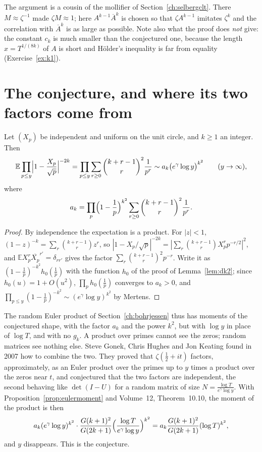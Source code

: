 The argument is a cousin of the mollifier of Section~\ref{ch:selbergclt}. There $M\approx\zeta^{-1}$ made $\zeta M\approx1$; here $A^{k-1}\overline A^k$ is chosen so that $\zeta A^{k-1}$ imitates $\zeta^k$ and the correlation with $\overline A^k$ is as large as possible. Note also what the proof does \emph{not} give: the constant $c_k$ is much smaller than the conjectured one, because the length $x=T^{1/(8k)}$ of $A$ is short and Hölder's inequality is far from equality (Exercise~\ref{ex:k1}).

\section{The conjecture, and where its two factors come from}

\begin{proposition}\label{prop:eulermoment}
Let $(X_p)$ be independent and uniform on the unit circle, and $k\ge1$ an integer. Then
\[
\mathbb E\prod_{p\le y}\Bigl|1-\frac{X_p}{\sqrt p}\Bigr|^{-2k}=\prod_{p\le y}\sum_{r\ge0}\binom{k+r-1}r^2\frac1{p^r}\sim a_k\bigl(e^\gamma\log y\bigr)^{k^2}\qquad(y\to\infty),
\]
where
\[
a_k=\prod_p\Bigl(1-\frac1p\Bigr)^{k^2}\sum_{r\ge0}\binom{k+r-1}r^2\frac1{p^r}.
\]
\end{proposition}
\begin{proof}
By independence the expectation is a product. For $|z|<1$, $(1-z)^{-k}=\sum_r\binom{k+r-1}rz^r$, so $|1-X_p/\sqrt p|^{-2k}=|\sum_r\binom{k+r-1}rX_p^rp^{-r/2}|^2$, and $\mathbb EX_p^r\overline{X_p}^{r'}=\delta_{rr'}$ gives the factor $\sum_r\binom{k+r-1}r^2p^{-r}$. Write it as $(1-\frac1p)^{-k^2}h_0(\frac1p)$ with the function $h_0$ of the proof of Lemma~\ref{lem:dk2}; since $h_0(u)=1+O(u^2)$, $\prod_ph_0(\frac1p)$ converges to $a_k>0$, and $\prod_{p\le y}(1-\frac1p)^{-k^2}\sim(e^\gamma\log y)^{k^2}$ by Mertens.
\end{proof}

The random Euler product of Section~\ref{ch:bohrjessen} thus has moments of the conjectured shape, with the factor $a_k$ and the power $k^2$, but with $\log y$ in place of $\log T$, and with no $g_k$. A product over primes cannot see the zeros; random matrices see nothing else. Steve Gonek, Chris Hughes and Jon Keating found in 2007 how to combine the two. They proved that $\zeta(\frac12+it)$ factors, approximately, as an Euler product over the primes up to $y$ times a product over the zeros near $t$, and conjectured that the two factors are independent, the second behaving like $\det(I-U)$ for a random matrix of size $N=\frac{\log T}{e^\gamma\log y}$. With Proposition~\ref{prop:eulermoment} and Volume~12, Theorem~10.10, the moment of the product is then
\[
a_k(e^\gamma\log y)^{k^2}\cdot\frac{G(k+1)^2}{G(2k+1)}\Bigl(\frac{\log T}{e^\gamma\log y}\Bigr)^{k^2}=a_k\frac{G(k+1)^2}{G(2k+1)}(\log T)^{k^2},
\]
and $y$ disappears. This is the conjecture.

